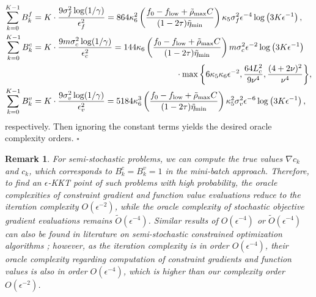 \documentclass[11pt]{article}
\newtheorem{remark}{Remark}
\newenvironment{proof}{{\noindent\it Proof.}\quad}{\hfill $\square$\par}
\begin{document}
\begin{proof}
    \begin{align*}
    \sum_{k=0}^{K-1} B_k^f & =  K \cdot \frac{9\sigma_f^2\log(1 /\gamma)}{\epsilon_f^2} = 864 \kappa_{6}^2\left(\frac{f_0-f_{\rm low}+\tilde \rho_{\rm max} C}{(1-2\tau)\tilde \eta_{\rm min}}\right) \kappa_5 \sigma_f^2 \epsilon^{-4} \log \left(3K\epsilon^{-1}\right),\\
    \sum_{k=0}^{K-1} B_k^c & = K \cdot \frac{9m\sigma_c^2\log(1 /\gamma)}{\epsilon_c^2} = 144\kappa_{6} \left(\frac{f_0-f_{\rm low}+\tilde \rho_{\rm max} C}{(1-2\tau)\tilde \eta_{\rm min}}\right) {m\sigma_c^2 \epsilon^{-2} \log \left(3K\epsilon^{-1}\right)} \\
    &\qquad\qquad\qquad\qquad\qquad\qquad\qquad\qquad\quad \cdot {\max\left\{6\kappa_5\kappa_{6}\epsilon^{-2},\frac{64L_c^2}{9\nu^4},\frac{(4+2\nu)^2}{\nu^4}\right\}},\\
    \sum_{k=0}^{K-1} B_k^v & = K \cdot \frac{9\sigma_v^2\log(1 /\gamma)}{\epsilon_v^2} = 5184 \kappa_{6}^3\left(\frac{f_0-f_{\rm low}+\tilde \rho_{\rm max} C}{(1-2\tau)\tilde \eta_{\rm min}}\right) \kappa_5^2 \sigma_v^2 \epsilon^{-6} \log \left(3K\epsilon^{-1}\right),
    \end{align*}
    respectively. Then 
    ignoring the constant terms yields the desired oracle complexity orders.
\end{proof}

\begin{remark}\label{rm:semi-mb}
    For semi-stochastic problems, we can compute the true values \(\nabla c_k\) and \(c_k\), which corresponds to  \(B_k^c = B_k^v = 1\) in the mini-batch approach. Therefore, to find an \(\epsilon\)-KKT point of such problems with high probability, the oracle complexities of constraint gradient and function value evaluations reduce to the iteration complexity \(O(\epsilon^{-2})\), while the oracle complexity of stochastic objective gradient evaluations remains \(\tilde O(\epsilon^{-4})\). 
    Similar results of \(O(\epsilon^{-4})\) or \(\tilde O(\epsilon^{-4})\) can also be found in literature on semi-stochastic constrained optimization algorithms \cite{boob2023stochastic,boob2025level,curtis2024worst,lu2024variance}; however, as the iteration complexity is in order $O(\epsilon^{-4})$, their oracle  complexity regarding computation of  constraint gradients and function values is also in order  \(O(\epsilon^{-4})\), which is higher than our complexity order \(O(\epsilon^{-2})\).
\end{remark}
\end{document}
